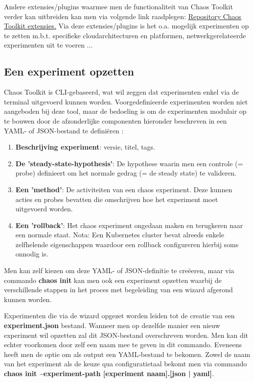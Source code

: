 Andere extensies/plugins waarmee men de functionaliteit van Chaos Toolkit verder kan uitbreiden kan men via volgende link raadplegen: \href{https://github.com/search?utf8=%E2%9C%93&q=topic%3Achaostoolkit-extension&type=Repositories}{Repository Chaos Toolkit extensies.}
\newline Via deze extensies/plugins is het o.a. mogelijk experimenten op te zetten m.b.t. specifieke cloudarchitecturen en platformen, netwerkgerelateerde experimenten uit te voeren ... 

\subsection{Een experiment opzetten}

Chaos Toolkit is CLI-gebaseerd, wat wil zeggen dat experimenten enkel via de terminal uitgevoerd kunnen worden. Voorgedefinieerde experimenten worden niet aangeboden bij deze tool, maar de bedoeling is om de experimenten modulair op te bouwen door de afzonderlijke componenten hieronder beschreven in een YAML- of JSON-bestand te definiëren \autocite{ChaosToolkit2022a}:
\begin{enumerate}
    \item {\bf Beschrijving experiment}: versie, titel, tags.
    \item {\bf De 'steady-state-hypothesis'}: De hypothese waarin men een controle (= probe) definieert om het normale gedrag (= de steady state) te valideren.
    \item {\bf Een 'method'}: De activiteiten van een chaos experiment. Deze kunnen acties en probes bevatten die omschrijven hoe het experiment moet uitgevoerd worden.  
    \item {\bf Een 'rollback'}: Het chaos experiment ongedaan maken en terugkeren naar een normale staat. Nota: Een Kubernetes cluster bevat alreeds enkele zelfhelende eigenschappen waardoor een rollback configureren hierbij soms onnodig is.
\end{enumerate}
    
Men kan zelf kiezen om deze YAML- of JSON-definitie te creëeren, maar via commando {\bf chaos init} kan men ook een experiment opzetten waarbij de verschillende stappen in het proces met begeleiding van een wizard afgerond kunnen worden. 

Experimenten die via de wizard opgezet worden leiden tot de creatie van een {\bf experiment.json} bestand. Wanneer men op dezelfde manier een nieuw experiment wil opzetten zal dit JSON-bestand overschreven worden. Men kan dit echter voorkomen door zelf een naam mee te geven in dit commando. Eveneens heeft men de optie om als output een YAML-bestand te bekomen. Zowel de naam van het experiment als de keuze qua configuratietaal bekomt men via commando {\bf chaos init --experiment-path [experiment naam].[json | yaml]}.

